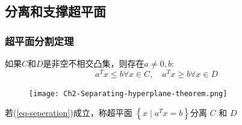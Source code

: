 \documentclass[handout]{beamer}
\begin{document}


\subsection{分离和支撑超平面}
\begin{frame}
\frametitle{超平面分割定理}

如果$C$和$D$是非空不相交凸集，则存在$a \neq 0, b$: 
\bigskip
\begin{equation}\label{eq-seperation}
	a^{T} x \leq b  \forall   x \in C, \quad a^{T} x \geq b \forall x \in D
\end{equation}
\begin{figure}[htbp]
    \centering
    \texttt{[image: Ch2-Separating-hyperplane-theorem.png]}
    \end{figure}

  若(\ref{eq-seperation})成立，称超平面 $\left\{x \mid a^{T} x=b\right\}$分离 $C$ 和 $D$



\end{frame}
\end{document}
